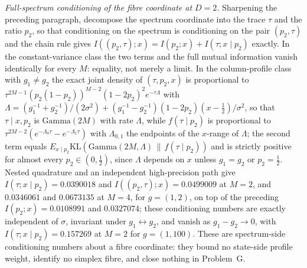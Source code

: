 \emph{Full-spectrum conditioning of the fibre coordinate at \(D=2\).} Sharpening the preceding paragraph, decompose the spectrum coordinate into the trace \(\tau\) and the ratio \(p_{2}\), so that conditioning on the spectrum is conditioning on the pair \((p_{2},\tau)\) and the chain rule gives \(I((p_{2},\tau);x)=I(p_{2};x)+I(\tau;x\mid p_{2})\) exactly. In the constant-variance class the two terms and the full mutual information vanish identically for every \(M\): equality, not merely a limit. In the column-profile class with \(g_{1}\neq g_{2}\) the exact joint density of \((\tau,p_{2},x)\) is proportional to \(\tau^{2M-1}(p_{2}(1-p_{2}))^{M-2}(1-2p_{2})^{2}e^{-\tau\Lambda}\) with \(\Lambda=(g_{1}^{-1}+g_{2}^{-1})/(2\sigma^{2})+(g_{1}^{-1}-g_{2}^{-1})(1-2p_{2})(x-\tfrac{1}{2})/\sigma^{2}\), so that \(\tau\mid x,p_{2}\) is \(\mathrm{Gamma}(2M)\) with rate \(\Lambda\), while \(f(\tau\mid p_{2})\) is proportional to \(\tau^{2M-2}(e^{-\Lambda_{0}\tau}-e^{-\Lambda_{1}\tau})\) with \(\Lambda_{0,1}\) the endpoints of the \(x\)-range of \(\Lambda\); the second term equals \(E_{x\mid p_{2}}\mathrm{KL}(\mathrm{Gamma}(2M,\Lambda)\,\|\,f(\tau\mid p_{2}))\) and is strictly positive for almost every \(p_{2}\in(0,\tfrac{1}{2})\), since \(\Lambda\) depends on \(x\) unless \(g_{1}=g_{2}\) or \(p_{2}=\tfrac{1}{2}\). Nested quadrature and an independent high-precision path give \(I(\tau;x\mid p_{2})=0.0390018\) and \(I((p_{2},\tau);x)=0.0499009\) at \(M=2\), and \(0.0346061\) and \(0.0673135\) at \(M=4\), for \(g=(1,2)\), on top of the preceding \(I(p_{2};x)=0.0108991\) and \(0.0327074\); these conditioning numbers are exactly independent of \(\sigma\), invariant under \(g_{1}\leftrightarrow g_{2}\), and vanish as \(g_{1}-g_{2}\to 0\), with \(I(\tau;x\mid p_{2})=0.157269\) at \(M=2\) for \(g=(1,100)\). These are spectrum-side conditioning numbers about a fibre coordinate: they bound no state-side profile weight, identify no simplex fibre, and close nothing in Problem~G.

